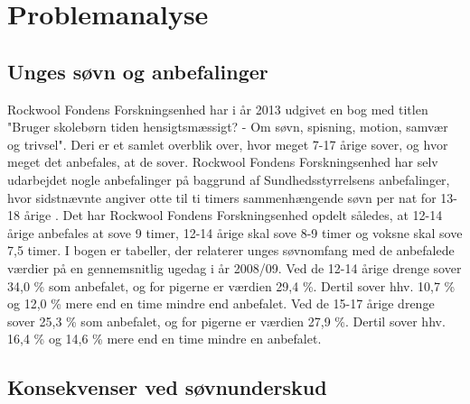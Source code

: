 \chapter{Problemanalyse}
\label{cha:Problemanalyse}


\section{Unges søvn og anbefalinger}
\label{sec:UngesSoevnOgAnbefalinger}



Rockwool Fondens Forskningsenhed har i år 2013 udgivet en bog med titlen "Bruger skolebørn tiden hensigtsmæssigt? - Om søvn, spisning, motion, samvær og trivsel". Deri er et samlet overblik over, hvor meget 7-17 årige sover, og hvor meget det anbefales, at de sover. Rockwool Fondens Forskningsenhed har selv udarbejdet nogle anbefalinger på baggrund af Sundhedsstyrrelsens anbefalinger, hvor sidstnævnte angiver otte til ti timers sammenhængende søvn per nat for 13-18 årige \cite{Sundhedsstyrrelsen2011}. Det har Rockwool Fondens Forskningsenhed opdelt således, at 12-14 årige anbefales at sove 9 timer, 12-14 årige skal sove 8-9 timer og voksne skal sove 7,5 timer. I bogen er tabeller, der relaterer unges søvnomfang med de anbefalede værdier på en gennemsnitlig ugedag i år 2008/09. Ved de 12-14 årige drenge sover 34,0 \% som anbefalet, og for pigerne er værdien 29,4 \%. Dertil sover hhv. 10,7 \% og 12,0 \% mere end en time mindre end anbefalet. Ved de 15-17 årige drenge sover 25,3 \% som anbefalet, og for pigerne er værdien 27,9 \%. Dertil sover hhv. 16,4 \% og 14,6 \% mere end en time mindre en anbefalet. \cite{Bonke2013}




\section{Konsekvenser ved søvnunderskud}
\label{sec:konsekvenser}

